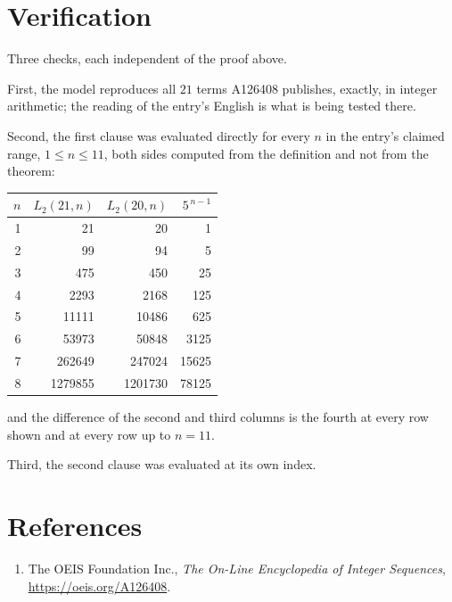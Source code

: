 \documentclass[11pt,a4paper]{article}
\theoremstyle{plain}
\theoremstyle{definition}
\begin{document}
\section{Verification}

Three checks, each independent of the proof above.

First, the model reproduces all $21$ terms A126408 publishes, exactly, in integer
arithmetic; the reading of the entry's English is what is being tested there.

Second, the first clause was evaluated directly for every $n$ in the entry's claimed range,
$1\le n\le11$, both sides computed from the definition and not from the theorem:

\begin{center}
\begin{tabular}{rrrr}
$n$ & $L_{2}(21,n)$ & $L_{2}(20,n)$ & $5^{\,n-1}$ \\ \hline
1 & 21 & 20 & 1 \\
2 & 99 & 94 & 5 \\
3 & 475 & 450 & 25 \\
4 & 2293 & 2168 & 125 \\
5 & 11111 & 10486 & 625 \\
6 & 53973 & 50848 & 3125 \\
7 & 262649 & 247024 & 15625 \\
8 & 1279855 & 1201730 & 78125 \\
\end{tabular}
\end{center}

\noindent and the difference of the second and third columns is the fourth at every row shown
and at every row up to $n=11$.

Third, the second clause was evaluated at its own index.

\section*{References}
\begin{enumerate}
\item The OEIS Foundation Inc., \emph{The On-Line Encyclopedia of Integer Sequences},
\url{https://oeis.org/A126408}.
\end{enumerate}
\end{document}
